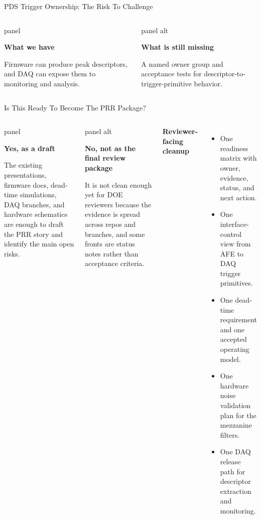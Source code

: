 \documentclass[aspectratio=169,10pt]{beamer}
\newcommand{\eyebrow}[1]{{\color{noircyan}\small\bfseries #1\par}}
\newcommand{\panelbox}[3][panel]{%
  \begin{beamercolorbox}[wd=\linewidth,sep=4pt,rounded=true]{#1}
    {\color{noircyan}\bfseries #2\par}
    \vspace{0.3mm}
    {\footnotesize #3\par}
  \end{beamercolorbox}
}
\begin{document}
\begin{frame}{PDS Trigger Ownership: The Risk To Challenge}
  \centering
  \vspace{7mm}
  \begin{columns}[T,onlytextwidth]
      \panelbox{What we have}{Firmware can produce peak descriptors, and DAQ can expose them to monitoring and analysis.}
      \panelbox[panel alt]{What is still missing}{A named owner group and acceptance tests for descriptor-to-trigger-primitive behavior.}
  \end{columns}
\end{frame}

\begin{frame}{Is This Ready To Become The PRR Package?}
  \begin{columns}[T,onlytextwidth]
      \panelbox{Yes, as a draft}{The existing presentations, firmware docs, dead-time simulations, DAQ branches, and hardware schematics are enough to draft the PRR story and identify the main open risks.}
      \vspace{3mm}
      \panelbox[panel alt]{No, not as the final review package}{It is not clean enough yet for DOE reviewers because the evidence is spread across repos and branches, and some fronts are status notes rather than acceptance criteria.}
      \eyebrow{Reviewer-facing cleanup}
      \begin{itemize}
        \item One readiness matrix with owner, evidence, status, and next action.
        \item One interface-control view from AFE to DAQ trigger primitives.
        \item One dead-time requirement and one accepted operating model.
        \item One hardware noise validation plan for the mezzanine filters.
        \item One DAQ release path for descriptor extraction and monitoring.
      \end{itemize}
  \end{columns}
\end{frame}
\end{document}
